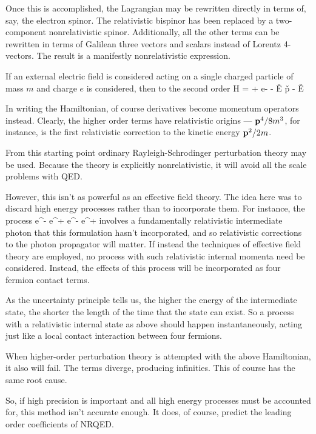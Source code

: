 Once this is accomplished, the Lagrangian may be rewritten directly in terms of, say, the electron spinor.  The relativistic bispinor has been replaced by a two-component nonrelativistic spinor.  Additionally, all the other terms can be rewritten in terms of Galilean three vectors and scalars instead of Lorentz 4-vectors.  The result is a manifestly nonrelativistic expression.  

If an external electric field is considered acting on a single charged particle of mass $m$ and charge $e$ is considered, then to the second order 
\beq
 H = 
 	 + e\Phi -  -  \gv{\sigma} \cdot \v{E} \times \v{p} -  \grad \cdot \v{E} 
\eeq

In writing the Hamiltonian, of course derivatives become momentum operators instead.  Clearly, the higher order terms have relativistic origins --- $\mathbf{p}^4 / 8m^3$, for instance, is the first relativistic correction to the kinetic energy $\mathbf{p}^2 / 2m$.

From this starting point ordinary Rayleigh-Schrodinger perturbation theory may be used.  Because the theory is explicitly nonrelativistic, it will avoid all the scale problems with QED. 

However, this isn't as powerful as an effective field theory.  The idea here was to discard high energy processes rather than to incorporate them.  For instance, the process
\beq
	e^- e^+ \to \gamma \to e^- e^+
\eeq 
involves a fundamentally relativistic intermediate photon that this formulation hasn't incorporated, and so relativistic corrections to the photon propagator will matter.  If instead the techniques of effective field theory are employed, no process with such relativistic internal momenta need be considered.  Instead, the effects of this process will be incorporated as four fermion contact terms.  

As the uncertainty principle tells us, the higher the energy of the intermediate state, the shorter the length of the time that the state can exist.  So a process with a relativistic internal state as above should happen instantaneously, acting just like a local contact interaction between four fermions.

When higher-order perturbation theory is attempted with the above Hamiltonian, it also will fail.  The terms diverge, producing infinities.  This of course has the same root cause. 

So, if high precision is important and all high energy processes must be accounted for, this method isn't accurate enough.  It does, of course, predict the leading order coefficients of NRQED.

